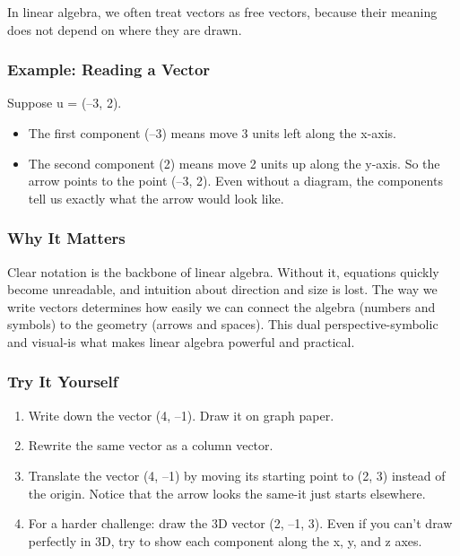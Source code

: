 \documentclass[
  letterpaper,
  DIV=11,
  numbers=noendperiod]{scrreprt}
\providecommand{\tightlist}{%
  \setlength{\itemsep}{0pt}\setlength{\parskip}{0pt}}
\begin{document}
In linear algebra, we often treat vectors as free vectors, because their
meaning does not depend on where they are drawn.

\subsubsection{Example: Reading a
Vector}\label{example-reading-a-vector}

Suppose u = (--3, 2).

\begin{itemize}
\tightlist
\item
  The first component (--3) means move 3 units left along the x-axis.
\item
  The second component (2) means move 2 units up along the y-axis. So
  the arrow points to the point (--3, 2). Even without a diagram, the
  components tell us exactly what the arrow would look like.
\end{itemize}

\subsubsection{Why It Matters}\label{why-it-matters-1}

Clear notation is the backbone of linear algebra. Without it, equations
quickly become unreadable, and intuition about direction and size is
lost. The way we write vectors determines how easily we can connect the
algebra (numbers and symbols) to the geometry (arrows and spaces). This
dual perspective-symbolic and visual-is what makes linear algebra
powerful and practical.

\subsubsection{Try It Yourself}\label{try-it-yourself-1}

\begin{enumerate}
\def\labelenumi{\arabic{enumi}.}
\tightlist
\item
  Write down the vector (4, --1). Draw it on graph paper.
\item
  Rewrite the same vector as a column vector.
\item
  Translate the vector (4, --1) by moving its starting point to (2, 3)
  instead of the origin. Notice that the arrow looks the same-it just
  starts elsewhere.
\item
  For a harder challenge: draw the 3D vector (2, --1, 3). Even if you
  can't draw perfectly in 3D, try to show each component along the x, y,
  and z axes.
\end{enumerate}
\end{document}
